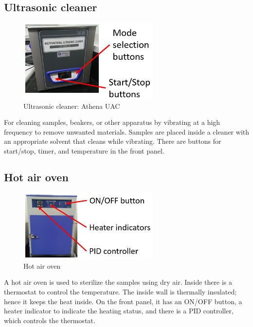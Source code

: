 \documentclass[12pt,a4paper,bold]{thesis}
\theoremstyle{thm}
\theoremstyle{definition}
\begin{document}
\subsection{Ultrasonic cleaner}
\begin{figure}[H]
	\centering
   \includegraphics[width=7cm]{Images/7.png} 
   \caption{Ultrasonic cleaner: Athena UAC}
\end{figure}
\indent\indent\indent For cleaning samples, beakers, or other apparatus by vibrating at a high frequency to remove unwanted materials. Samples are placed inside a cleaner with an appropriate solvent that cleans while vibrating. There are buttons for start/stop, timer, and temperature in the front panel.

\subsection{Hot air oven}
\begin{figure}[H]
	\centering
   \includegraphics[width=7cm]{Images/8.png} 
   \caption{Hot air oven}
\end{figure}

\indent\indent\indent A hot air oven is used to sterilize the samples using dry air. Inside there is a thermostat to control the temperature. The inside wall is thermally insulated; hence it keeps the heat inside. On the front panel, it has an ON/OFF button, a heater indicator to indicate the heating status, and there is a PID controller, which controls the thermostat. 
\end{document}
